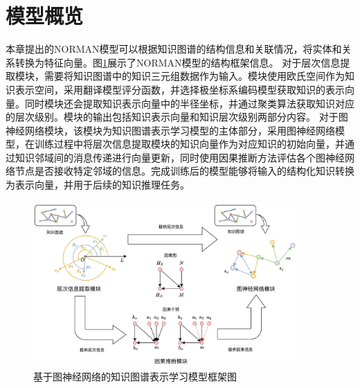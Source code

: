 \documentclass[algorithmlist, AutoFakeBold, AutoFakeSlant, figurelist, tablelist, nomlist, engineering]{seuthesix}
\begin{document}
\section{模型概览}
本章提出的NORMAN模型可以根据知识图谱的结构信息和关联情况，将实体和关系转换为特征向量。图\ref{2_NORMAN}展示了NORMAN模型的结构框架信息。
对于层次信息提取模块，需要将知识图谱中的知识三元组数据作为输入。模块使用欧氏空间作为知识表示空间，采用翻译模型评分函数，并选择极坐标系编码模型获取知识的表示向量。同时模块还会提取知识表示向量中的半径坐标，并通过聚类算法获取知识对应的层次级别。模块的输出包括知识表示向量和知识层次级别两部分内容。
对于图神经网络模块，该模块为知识图谱表示学习模型的主体部分，采用图神经网络模型，在训练过程中将层次信息提取模块的知识向量作为对应知识的初始向量，并通过知识邻域间的消息传递进行向量更新，同时使用因果推断方法评估各个图神经网络节点是否接收特定邻域的信息。完成训练后的模型能够将输入的结构化知识转换为表示向量，并用于后续的知识推理任务。
\begin{figure}[H]
  \centering
  \includegraphics[width=0.9\textwidth]{2_NORMAN}
  \caption{基于图神经网络的知识图谱表示学习模型框架图}
  \label{2_NORMAN}
\end{figure}
\end{document}
